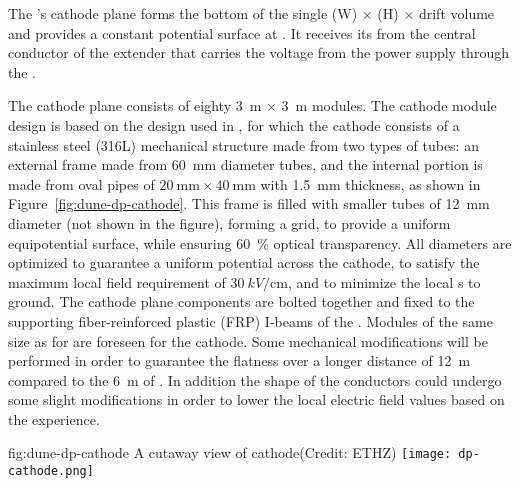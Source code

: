 The \dpmod{}'s cathode plane forms the  bottom of the single 
\dptpcwdth (W) $\times$ \tpcheight (H) $\times$ \dptpclen
drift volume and provides a constant potential surface at \dptargetdriftvoltneg{}.  It receives its  from the central conductor of the extender that carries the voltage from the power supply through the  \fdth.  

The cathode plane consists of eighty \SI{3}{\m} $\times$ \SI{3}{\m} modules. 
The cathode module design is based on the design used in  , for which the cathode consists of a stainless steel (316L) mechanical structure 
made from two types of tubes: 
an external frame made from \SI{60}{\milli\m} diameter tubes, and the internal portion is made from oval pipes of $\SI{20}{\milli\m}\times \SI{40}{\milli\m}$ with \SI{1.5}{mm} thickness, as shown in Figure~\ref{fig:dune-dp-cathode}. 
This frame is filled with smaller tubes of \SI{12}{\milli\m} diameter (not shown in the figure), forming a grid, to provide a uniform equipotential surface, while ensuring \SI{60}{\%} optical transparency. All diameters are optimized to guarantee a uniform potential across the cathode, to satisfy the maximum local field requirement of $\SI{30}{kV/\centi\m}$, and to minimize the local \efield{}s to ground. 
The cathode plane components are bolted together and fixed to the supporting  fiber-reinforced plastic (FRP) I-beams of the . 
Modules of the same size as for  are foreseen for the \dpmod{} cathode. Some mechanical modifications will be performed in order to guarantee the flatness over a longer distance of  \SI{12}{\m} compared to the  \SI{6}{\m} of  .  In addition the shape of the conductors could undergo some slight modifications in order to lower the local electric field values based on the  experience.

\begin{dunefigure}{fig:dune-dp-cathode}
{A cutaway view of  cathode(Credit: ETHZ)}
\texttt{[image: dp-cathode.png]}
\end{dunefigure}

